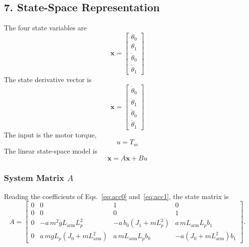\documentclass[a4paper,11pt]{article}
\newcommand{\La}{L_{\mathrm{arm}}}
\begin{document}
\subsection{7. State-Space Representation}
The four state variables are
\begin{equation}
  \mathbf{x} = \begin{bmatrix} \theta_0 \\ \theta_1 \\ \dot\theta_0 \\ \dot\theta_1 \end{bmatrix}
\end{equation}
The state derivative vector is
\begin{equation}
  \dot{\mathbf{x}} = \begin{bmatrix} \dot\theta_0 \\ \dot\theta_1 \\ \ddot\theta_0 \\ \ddot\theta_1 \end{bmatrix}
\end{equation}
The input is the motor torque,
\begin{equation}
  u = T_m
\end{equation}
The linear state-space model is
\begin{equation}
  \dot{\mathbf{x}} = A\mathbf{x} + Bu
\end{equation}

\subsubsection{System Matrix \texorpdfstring{$A$}{A}}
Reading the coefficients of Eqs.~\eqref{eq:acc0} and~\eqref{eq:acc1}, the state matrix is
\begin{equation}
\boxed{
A = \begin{bmatrix}
0 & 0 & 1 & 0\\
0 & 0 & 0 & 1\\
0 & -a\, m^2 g \La L_p^2 & -a\, b_0 \left(J_1 + m L_p^2\right) & a\, m \La L_p b_1\\
0 & a\, m g L_p \left(J_0 + m \La^2\right) & a\, m \La L_p b_0 & -a\left(J_0 + m \La^2\right) b_1
\end{bmatrix}.
}
\end{equation}
\end{document}
